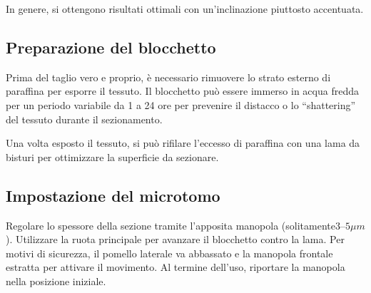 In genere, si ottengono risultati ottimali con un'inclinazione piuttosto accentuata.


\subsection{Preparazione del blocchetto}

Prima del taglio vero e proprio, è necessario rimuovere lo strato esterno di paraffina per esporre il tessuto. Il blocchetto può essere immerso in acqua fredda per un periodo variabile da 1 a 24 ore per prevenire il distacco o lo “shattering” del tessuto durante il sezionamento.

Una volta esposto il tessuto, si può rifilare l'eccesso di paraffina con una lama da bisturi per ottimizzare la superficie da sezionare.


\subsection{Impostazione del microtomo}

Regolare lo spessore della sezione tramite l'apposita manopola (solitamente$3–5\mu m$). Utilizzare la ruota principale per avanzare il blocchetto contro la lama. Per motivi di sicurezza, il pomello laterale va abbassato e la manopola frontale estratta per attivare il movimento. Al termine dell'uso, riportare la manopola nella posizione iniziale.


